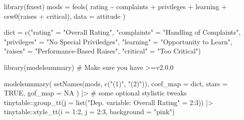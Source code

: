 \documentclass[
  letterpaper,
  DIV=11,
  numbers=noendperiod]{scrartcl}
\newenvironment{Shaded}{\begin{snugshade}}{\end{snugshade}}
\newcommand{\AttributeTok}[1]{\textcolor[rgb]{0.40,0.45,0.13}{#1}}
\newcommand{\CommentTok}[1]{\textcolor[rgb]{0.37,0.37,0.37}{#1}}
\newcommand{\ConstantTok}[1]{\textcolor[rgb]{0.56,0.35,0.01}{#1}}
\newcommand{\DecValTok}[1]{\textcolor[rgb]{0.68,0.00,0.00}{#1}}
\newcommand{\FunctionTok}[1]{\textcolor[rgb]{0.28,0.35,0.67}{#1}}
\newcommand{\NormalTok}[1]{\textcolor[rgb]{0.00,0.23,0.31}{#1}}
\newcommand{\OtherTok}[1]{\textcolor[rgb]{0.00,0.23,0.31}{#1}}
\newcommand{\SpecialCharTok}[1]{\textcolor[rgb]{0.37,0.37,0.37}{#1}}
\newcommand{\StringTok}[1]{\textcolor[rgb]{0.13,0.47,0.30}{#1}}
\begin{document}
\begin{Shaded}
\begin{Highlighting}[]
\FunctionTok{library}\NormalTok{(fixest)}
\NormalTok{  mods }\OtherTok{=} \FunctionTok{feols}\NormalTok{(}
\NormalTok{  rating }\SpecialCharTok{\textasciitilde{}}\NormalTok{ complaints }\SpecialCharTok{+}\NormalTok{ privileges }\SpecialCharTok{+}\NormalTok{ learning }\SpecialCharTok{+} \FunctionTok{csw0}\NormalTok{(raises }\SpecialCharTok{+}\NormalTok{ critical), }\AttributeTok{data =}\NormalTok{ attitude}
\NormalTok{)}

\NormalTok{dict }\OtherTok{=} \FunctionTok{c}\NormalTok{(}\StringTok{"rating"}     \OtherTok{=} \StringTok{"Overall Rating"}\NormalTok{,}
         \StringTok{"complaints"} \OtherTok{=} \StringTok{"Handling of Complaints"}\NormalTok{,}
         \StringTok{"privileges"} \OtherTok{=} \StringTok{"No Special Priviledges"}\NormalTok{,}
         \StringTok{"learning"}   \OtherTok{=} \StringTok{"Opportunity to Learn"}\NormalTok{,}
         \StringTok{"raises"}     \OtherTok{=} \StringTok{"Performance{-}Based Raises"}\NormalTok{,}
         \StringTok{"critical"}   \OtherTok{=} \StringTok{"Too Critical"}\NormalTok{)}

\FunctionTok{library}\NormalTok{(modelsummary) }\CommentTok{\# Make sure you have \textgreater{}=v2.0.0}

\FunctionTok{modelsummary}\NormalTok{(}
  \FunctionTok{setNames}\NormalTok{(mods, }\FunctionTok{c}\NormalTok{(}\StringTok{"(1)"}\NormalTok{, }\StringTok{"(2)"}\NormalTok{)),}
  \AttributeTok{coef\_map =}\NormalTok{ dict, }\AttributeTok{stars =} \ConstantTok{TRUE}\NormalTok{,}
  \AttributeTok{gof\_map =} \ConstantTok{NA}
\NormalTok{  ) }\SpecialCharTok{|\textgreater{}}
  \CommentTok{\# some optional stylistic tweaks}
\NormalTok{  tinytable}\SpecialCharTok{::}\FunctionTok{group\_tt}\NormalTok{(}\AttributeTok{j =} \FunctionTok{list}\NormalTok{(}\StringTok{"Dep. variable: Overall Rating"} \OtherTok{=} \DecValTok{2}\SpecialCharTok{:}\DecValTok{3}\NormalTok{)) }\SpecialCharTok{|\textgreater{}}
\NormalTok{  tinytable}\SpecialCharTok{::}\FunctionTok{style\_tt}\NormalTok{(}\AttributeTok{i =} \DecValTok{1}\SpecialCharTok{:}\DecValTok{2}\NormalTok{, }\AttributeTok{j =} \DecValTok{2}\SpecialCharTok{:}\DecValTok{3}\NormalTok{, }\AttributeTok{background =} \StringTok{"pink"}\NormalTok{)}
\end{Highlighting}
\end{Shaded}
\end{document}
